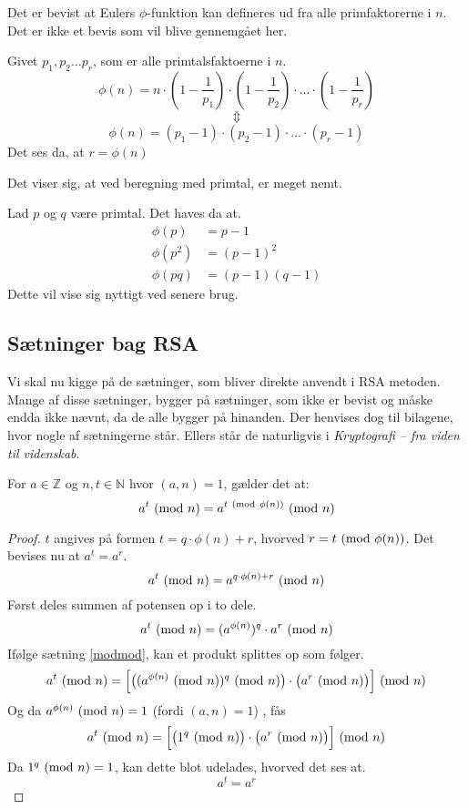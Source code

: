 Det er bevist at Eulers \(\phi\)-funktion kan defineres ud fra alle primfaktorerne i \(n\).
Det er ikke et bevis som vil blive gennemgået her.

\begin{sent}
    Givet \(p_1, p_2 \hdots p_r\), som er alle primtalsfaktoerne i \(n\).
    \[\phi(n) = n \cdot \left(1-\frac{1}{p_1}\right) \cdot \left(1-\frac{1}{p_2}\right) \cdot \hdots \cdot \left(1-\frac{1}{p_r}\right)\]
    \[\Updownarrow\]
    \[\phi(n) = (p_1 - 1) \cdot (p_2 - 1) \cdot \hdots \cdot (p_r - 1)\]
    Det ses da, at \(r = \phi(n)\)
\end{sent}

Det viser sig, at ved beregning med primtal, er meget nemt.

\begin{eks}
    Lad \(p\) og \(q\) være primtal. Det haves da at.
    \begin{align}
        \phi(p)   &= p - 1\\
        \phi(p^2) &= (p - 1)^2\\
        \phi(p q) &= (p - 1)(q - 1)
    \end{align}
    Dette vil vise sig nyttigt ved senere brug.
\end{eks}



\subsection{Sætninger bag RSA}
Vi skal nu kigge på de sætninger, som bliver direkte anvendt i RSA metoden.
Mange af disse sætninger, bygger på sætninger, som ikke er bevist og måske endda ikke nævnt, da de alle bygger på hinanden.
Der henvises dog til bilagene, hvor nogle af sætningerne står.
Ellers står de naturligvis i \textit{Kryptografi -- fra viden til videnskab}. \cite{krypto}

\begin{sent}
    \label{eulerssent}
    For \(a \in \mathbb{Z}\) og \(n, t \in \mathbb{N}\) hvor \((a, n) = 1\), gælder det at:
    \[a^t \ (\mathrm{mod}\ n) = a^{t \ (\mathrm{mod}\ \phi(n))} \ (\mathrm{mod}\ n)\]
\end{sent}

\begin{proof}
    \(t\) angives på formen \(t = q \cdot \phi(n) + r\), hvorved \(r = t \ (\mathrm{mod}\ \phi(n))\).
    Det bevises nu at \(a^t = a^r\).
    \[a^t \ (\mathrm{mod}\ n) = a^{q \cdot \phi(n) + r} \ (\mathrm{mod}\ n)\]
    Først deles summen af potensen op i to dele.
    \[a^t \ (\mathrm{mod}\ n) = (a^{\phi(n)})^q \cdot a^r \ (\mathrm{mod}\ n)\]
    Ifølge sætning \ref{modmod}, kan et produkt splittes op som følger.
    \[a^t \ (\mathrm{mod}\ n) = \Big[ \big( (a^{\phi(n)} \ (\mathrm{mod}\ n))^q \ (\mathrm{mod}\ n) \big) \cdot \big( a^r \ (\mathrm{mod}\ n) \big) \Big] \ (\mathrm{mod}\ n)\] %
    Og da \(a^{\phi(n)} \ (\mathrm{mod}\ n) = 1\) (fordi \((a, n) = 1\)) \cite[90]{krypto}, fås
    \[a^t \ (\mathrm{mod}\ n) = \Big[ \big( 1^q \ (\mathrm{mod}\ n) \big) \cdot \big( a^r \ (\mathrm{mod}\ n) \big) \Big] \ (\mathrm{mod}\ n)\]
    Da \(1^q \ (\mathrm{mod}\ n) = 1\), kan dette blot udelades, hvorved det ses at.
    \[a^t = a^r\]
\end{proof}

